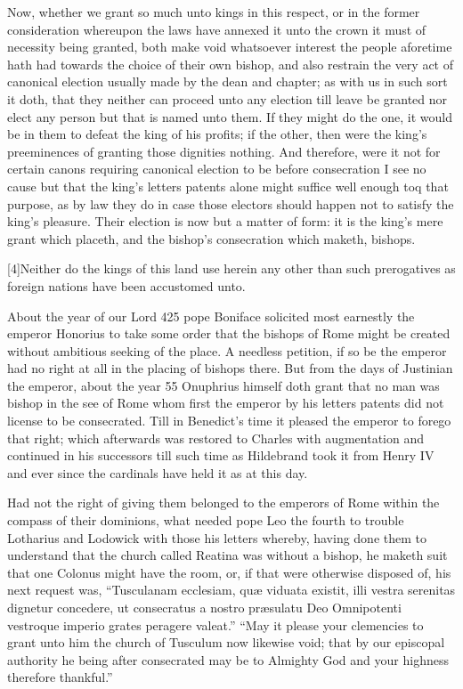 Now, whether we grant so much unto kings in this respect, or in the former consideration whereupon the laws have annexed it unto the crown it must of necessity being  granted, both make void whatsoever interest the people aforetime hath had towards the choice of their own bishop, and also restrain the very act of canonical election usually made by the dean and chapter; as with us in such sort it doth, that they neither can proceed unto any election till leave be granted nor elect any person but that is named unto them. If they might do the one, it would be in them to defeat the king of his profits; if the other, then were the king’s preeminences of granting those dignities nothing. And therefore, were it not for certain canons requiring canonical election to be before consecration I see no cause but that the king’s letters patents alone might suffice well enough  toq that purpose, as by law they do in case those electors should happen not to satisfy the king’s pleasure. Their election is now but a matter of form: it is the king’s mere grant which placeth, and the bishop’s consecration which maketh, bishops.

[4]Neither do the kings of this land use herein any other than such prerogatives as foreign nations have been accustomed unto.

About the year of our Lord 425 pope Boniface solicited most earnestly the emperor Honorius to take some order that the bishops of Rome might be created without ambitious seeking of the place. A needless petition, if so be the emperor had no right at all in the placing of bishops there. But from the days of Justinian the emperor, about the year 55 Onuphrius himself doth grant that no man was bishop in the see of Rome whom first the emperor by his letters patents did not license to be consecrated. Till in Benedict’s time it pleased the emperor to forego that right; which afterwards  was restored to Charles with augmentation and continued in his successors till such time as Hildebrand took it from Henry IV and ever since the cardinals have held it as at this day.

Had not the right of giving them belonged to the emperors of Rome within the compass of their dominions, what needed pope Leo the fourth to trouble Lotharius and Lodowick with those his letters whereby, having done them to understand that the church called Reatina was without a bishop, he maketh suit that one Colonus might have the room, or, if that were otherwise disposed of, his next request was, “Tusculanam ecclesiam, quæ viduata existit, illi vestra serenitas dignetur concedere, ut consecratus a nostro præsulatu Deo Omnipotenti vestroque imperio grates  peragere valeat.” “May it please your clemencies to grant unto him the church of Tusculum now likewise void; that by our episcopal authority he being after consecrated may be to Almighty God and your highness therefore thankful.”


